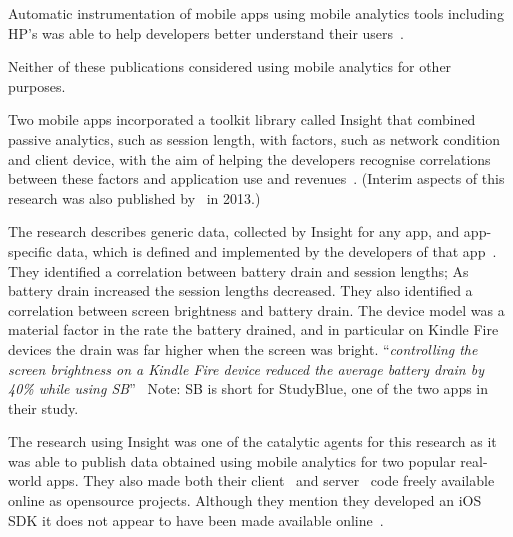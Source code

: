 Automatic instrumentation of mobile apps using mobile analytics tools including HP's  was able to help developers better understand their users~.

Neither of these publications considered using mobile analytics for other purposes.

Two mobile apps incorporated a toolkit library called Insight that combined passive analytics, such as session length, with factors, such as network condition and client device, with the aim of helping the developers recognise correlations between these factors and application use and revenues~. (Interim aspects of this research was also published by~ in 2013.)

The research describes generic data, collected by Insight for any app, and app-specific data, which is defined and implemented by the developers of that app~. They identified a correlation between battery drain and session lengths; As battery drain increased the session lengths decreased. They also identified a correlation between screen brightness and battery drain. The device model was a material factor in the rate the battery drained, and in particular on Kindle Fire devices the drain was far higher when the screen was bright. ``\emph{controlling the screen brightness on a Kindle Fire device reduced the average battery drain by 40\% while using SB}''~ Note: SB is short for StudyBlue, one of the two apps in their study.

The research using Insight was one of the catalytic agents for this research as it was able to publish data obtained using mobile analytics for two popular real-world apps. 
They also made both their client~ and server~ code freely available online as opensource projects. 
Although they mention they developed an iOS SDK it does not appear to have been made available online~.

